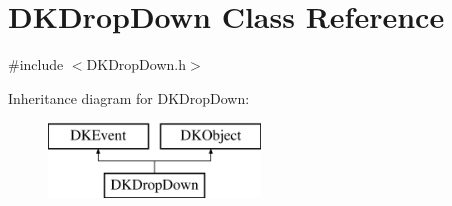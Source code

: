 \hypertarget{class_d_k_drop_down}{\section{D\-K\-Drop\-Down Class Reference}
\label{class_d_k_drop_down}
}


{\ttfamily \#include $<$D\-K\-Drop\-Down.\-h$>$}

Inheritance diagram for D\-K\-Drop\-Down\-:\begin{figure}[H]
\begin{center}
\leavevmode
\includegraphics[height=2.000000cm]{class_d_k_drop_down}
\end{center}
\end{figure}
